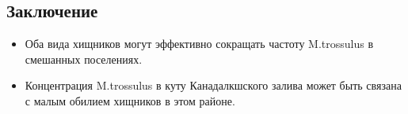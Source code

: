 \documentclass[a0,portrait]{a0poster}
\begin{document}
\begin{multicols}{2}
		\color{SaddleBrown} %
		
		\section*{Заключение}
		
		\begin{itemize}
			\item Оба вида хищников могут эффективно сокращать частоту M.trossulus в смешанных поселениях. 
			\item Концентрация M.trossulus в куту Канадалкшского залива может быть связана с малым обилием хищников в этом районе. 
		\end{itemize}
		
		\color{DarkSlateGray} %
		
		
		
		
		
\end{multicols}
	
\end{document}
